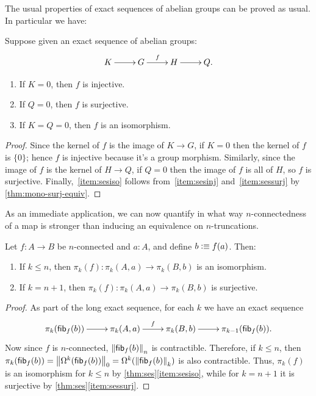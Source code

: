 The usual properties of exact sequences of abelian groups can be proved as
usual. In particular we have:
\begin{lem}\label{thm:ses}
  Suppose given an exact sequence of abelian groups:
  \[\xymatrix{K \ar[r]& G \ar^f[r] & H \ar[r] & Q.}\]
  \begin{enumerate}
  \item If $K=0$, then $f$ is injective.\label{item:sesinj}
  \item If $Q=0$, then $f$ is surjective.\label{item:sessurj}
  \item If $K=Q=0$, then $f$ is an isomorphism.\label{item:sesiso}
  \end{enumerate}
\end{lem}
\begin{proof}
  Since the kernel of $f$ is the image of $K\to G$, if $K=0$ then the kernel of $f$ is $\{0\}$;
  hence $f$ is injective because it's a group morphism.
  Similarly, since the image of $f$ is the kernel of $H\to Q$, if $Q=0$ then the image of $f$ is all of $H$, so $f$ is surjective.
  Finally,~\ref{item:sesiso} follows from~\ref{item:sesinj} and~\ref{item:sessurj} by \autoref{thm:mono-surj-equiv}.
\end{proof}

As an immediate application, we can now quantify in what way $n$-connectedness of a map is stronger than inducing an equivalence on $n$-truncations.

\begin{cor}\label{thm:conn-pik}
  Let $f:A\to B$ be $n$-connected and $a:A$, and define $b\defeq f(a)$.  Then:
  \begin{enumerate}
  \item If $k\le n$, then $\pi_k(f):\pi_k(A,a) \to \pi_k(B,b)$ is an isomorphism.
  \item If $k=n+1$, then $\pi_k(f):\pi_k(A,a) \to \pi_k(B,b)$ is surjective.
  \end{enumerate}
\end{cor}
\begin{proof}
  As part of the long exact sequence, for each $k$ we have an exact sequence
  \[\xymatrix{\pi_k(\hfib f b) \ar[r]& \pi_k(A,a) \ar^f[r] & \pi_k(B,b) \ar[r] & \pi_{k-1}(\hfib f b).}\]
  Now since $f$ is $n$-connected, $\trunc n{\hfib f b}$ is contractible.
  Therefore, if $k\le n$, then $\pi_k(\hfib f b) = \trunc0{\Omega^k(\hfib f b)} = \Omega^k(\trunc k{\hfib f b})$ is also contractible.
  Thus, $\pi_k(f)$ is an isomorphism for $k\le n$ by \autoref{thm:ses}\ref{item:sesiso}, while for $k=n+1$ it is surjective by \autoref{thm:ses}\ref{item:sessurj}.
\end{proof}


